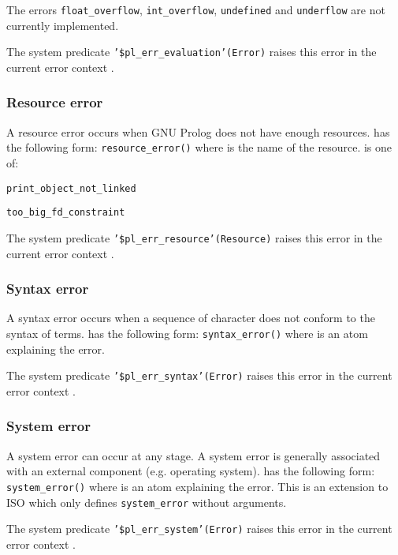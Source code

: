 The errors \texttt{float\_overflow}, \texttt{int\_overflow},
\texttt{undefined} and \texttt{underflow} are not currently
implemented.

The system predicate \texttt{'\$pl\_err\_evaluation'(Error)} raises this
error in the current error context .

\subsubsection{Resource error}
\label{Resource-error}
A resource error occurs when GNU Prolog does not have enough resources.
 has the following form:
\texttt{resource\_error()} where  is the
name of the resource.  is one of:

\begin{ItemizeThreeCols}

\item \texttt{print\_object\_not\_linked}

\item \texttt{too\_big\_fd\_constraint}

\end{ItemizeThreeCols}

The system predicate \texttt{'\$pl\_err\_resource'(Resource)} raises this
error in the current error context .

\subsubsection{Syntax error}
\label{Syntax-error}
A syntax error occurs when a sequence of character does not conform to the
syntax of terms.  has the following form:
\texttt{syntax\_error()} where  is an
atom explaining the error.

The system predicate \texttt{'\$pl\_err\_syntax'(Error)} raises this
error in the current error context .

\subsubsection{System error}
A system error can occur at any stage. A system error is generally
associated with an external component (e.g. operating system).
 has the following form:
\texttt{system\_error()} where  is an
atom explaining the error. This is an extension to ISO which only defines
\texttt{system\_error} without arguments.

The system predicate \texttt{'\$pl\_err\_system'(Error)} raises this
error in the current error context .

